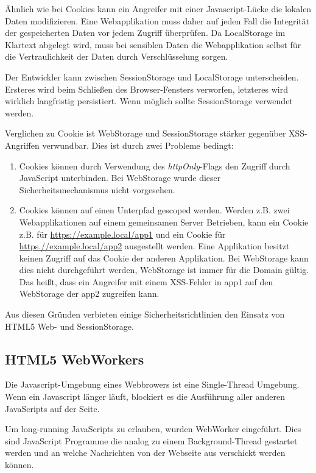 Ähnlich wie bei Cookies kann ein Angreifer mit einer Javascript-Lücke die lokalen Daten modifizieren. Eine Webapplikation muss daher auf jeden Fall die Integrität der gespeicherten Daten vor jedem Zugriff überprüfen. Da LocalStorage im Klartext abgelegt wird, muss bei sensiblen Daten die Webapplikation selbst für die Vertraulichkeit der Daten durch Verschlüsselung sorgen.

Der Entwickler kann zwischen SessionStorage und LocalStorage unterscheiden. Ersteres wird beim Schließen des Browser-Fensters verworfen, letzteres wird wirklich langfristig persistiert. Wenn möglich sollte SessionStorage verwendet werden.

Verglichen zu Cookie ist WebStorage und SessionStorage stärker gegenüber XSS-Angriffen verwundbar. Dies ist durch zwei Probleme bedingt:

\begin{enumerate}
\item Cookies können durch Verwendung des \textit{httpOnly}-Flags den Zugriff durch JavaScript unterbinden. Bei WebStorage wurde dieser Sicherheitsmechanismus nicht vorgesehen.
\item Cookies können auf einen Unterpfad gescoped werden. Werden z.B. zwei Webapplikationen auf einem gemeinsamen Server Betrieben, kann ein Cookie z.B. für \url{https://example.local/app1} und ein Cookie für \url{https.//example.local/app2} ausgestellt werden. Eine Applikation besitzt keinen Zugriff auf das Cookie der anderen Applikation. Bei WebStorage kann dies nicht durchgeführt werden, WebStorage ist immer für die Domain gültig. Das heißt, dass ein Angreifer mit einem XSS-Fehler in app1 auf den WebStorage der app2 zugreifen kann.
\end{enumerate}

Aus diesen Gründen verbieten einige Sicherheitsrichtlinien den Einsatz von HTML5 Web- und SessionStorage.

\subsection{HTML5 WebWorkers}

Die Javascript-Umgebung eines Webbrowers ist eine Single-Thread Umgebung. Wenn ein Javascript länger läuft, blockiert es die Ausführung aller anderen JavaScripts auf der Seite.

Um long-running JavaScripts zu erlauben, wurden WebWorker eingeführt. Dies sind JavaScript Programme die analog zu einem Background-Thread gestartet werden und an welche Nachrichten von der Webseite aus verschickt werden können.

